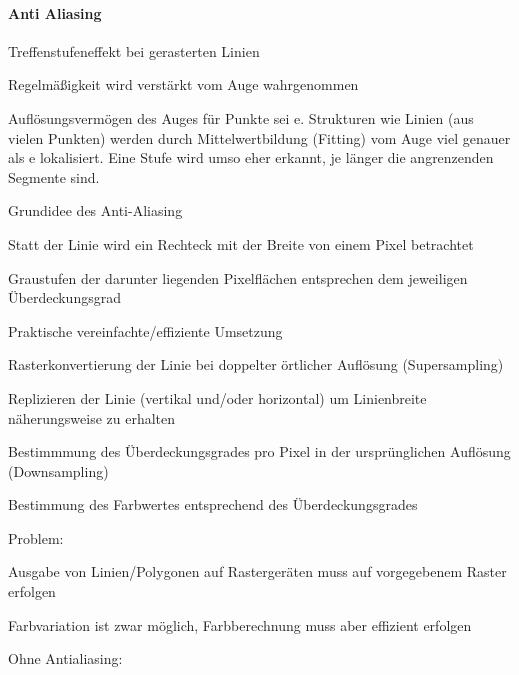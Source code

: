 \documentclass[landscape]{article}
\begin{document}
\begin{multicols}{3}
  \paragraph{Anti Aliasing}
  \begin{itemize*}
    \item Treffenstufeneffekt bei gerasterten Linien
    \item Regelmäßigkeit wird verstärkt vom Auge wahrgenommen
    \item Auflösungsvermögen des Auges für Punkte sei e. Strukturen wie Linien (aus vielen Punkten) werden durch Mittelwertbildung (Fitting) vom Auge viel genauer als e lokalisiert. Eine Stufe wird umso eher erkannt, je länger die angrenzenden Segmente sind.
    \item Grundidee des Anti-Aliasing
          \begin{itemize*}
            \item Statt der Linie wird ein Rechteck mit der Breite von einem Pixel betrachtet
            \item Graustufen der darunter liegenden Pixelflächen entsprechen dem jeweiligen Überdeckungsgrad
          \end{itemize*}
    \item Praktische vereinfachte/effiziente Umsetzung
          \begin{itemize*}
            \item Rasterkonvertierung der Linie bei doppelter örtlicher Auflösung (Supersampling)
            \item Replizieren der Linie (vertikal und/oder horizontal) um Linienbreite näherungsweise zu erhalten
            \item Bestimmmung des Überdeckungsgrades pro Pixel in der ursprünglichen Auflösung (Downsampling)
            \item Bestimmung des Farbwertes entsprechend des Überdeckungsgrades
          \end{itemize*}
    \item Problem:
          \begin{itemize*}
            \item Ausgabe von Linien/Polygonen auf Rastergeräten muss auf vorgegebenem Raster erfolgen
            \item Farbvariation ist zwar möglich, Farbberechnung muss aber effizient erfolgen
          \end{itemize*}
    \item Ohne Antialiasing:
          \begin{itemize*}

\end{itemize*}
\end{itemize*}
\end{multicols}
\end{document}
